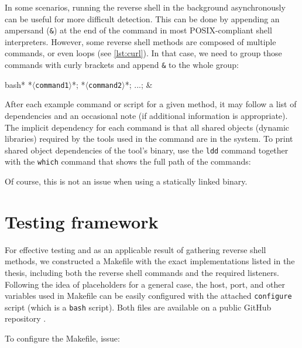 In some scenarios, running the reverse shell in the background asynchronously can be useful for more difficult detection. This can be done by appending an ampersand (\texttt{\&}) at the end of the command \cite{bash-gnu-man} in most POSIX-compliant shell interpreters. However, some reverse shell methods are composed of multiple commands, or even loops (see \cref{lst:curl}). In that case, we need to group those commands with curly brackets and append \texttt{\&} to the whole group:

\begin{cmdline}{bash}{*}{}{}
{ *\textcolor{placeholder}{\texttt{$\langle$command1$\rangle$}}*; *\textcolor{placeholder}{\texttt{$\langle$command2$\rangle$}}*; ...; } &
\end{cmdline}

After each example command or script for a given method, it may follow a list of dependencies and an occasional note (if additional information is appropriate). The implicit dependency for each command is that all shared objects (dynamic libraries) required by the tools used in the command are in the system. To print shared object dependencies of the tool's binary, use the \texttt{ldd} command together with the \texttt{which} command that shows the full path of the commands:

Of course, this is not an issue when using a statically linked binary.


\section{Testing framework}

For effective testing and as an applicable result of gathering reverse shell methods, we constructed a Makefile with the exact implementations listed in the thesis, including both the reverse shell commands and the required listeners. Following the idea of placeholders for a general case, the host, port, and other variables used in Makefile can be easily configured with the attached \texttt{configure} script (which is a \texttt{bash} script). Both files are available on a public GitHub repository .

To configure the Makefile, issue:


